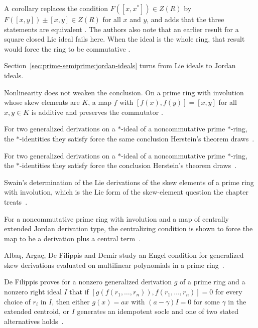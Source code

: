 A corollary replaces the condition $F([x,x^{*}])\in Z(R)$ by
$F([x,y])\pm[x,y]\in Z(R)$ for all $x$ and $y$, and adds that the three statements
are equivalent \cite[Corollary~1, p.~1950001-5]{Idrissi2019}. The authors also note
that an earlier result for a square closed Lie ideal fails here. When the ideal is
the whole ring, that result would force the ring to be commutative
\cite[p.~1950001-5]{Idrissi2019}.

Section~\ref{sec:prime-semiprime:jordan-ideals} turns from Lie ideals to Jordan
ideals.

Nonlinearity does not weaken the conclusion. On a prime ring with involution
whose skew elements are $K$, a map $f$ with $[f(x),f(y)]=[x,y]$ for all
$x,y\in K$ is additive and preserves the commutator
\cite[Abstract]{NonlinearStrongCommuting2012}.

For two generalized derivations on a $*$-ideal of a noncommutative prime $*$-ring, the $*$-identities they satisfy force the same conclusion Herstein's theorem draws~\cite{WlHersteinsTheorem2023}.

For two generalized derivations on a $*$-ideal of a noncommutative prime $*$-ring, the $*$-identities they satisfy force the conclusion Herstein's theorem draws~\cite{WlHersteinSTheoremForPairOfGener2023}.

Swain's determination of the Lie derivations of the skew elements of a prime ring with involution, which is the Lie form of the skew-element question the chapter treats~\cite{WlLieDerivationsOfTheSkewElement1996}.

For a noncommutative prime ring with involution and a map of centrally extended Jordan derivation type, the centralizing condition is shown to force the map to be a derivation plus a central term~\cite{WlCentrallyExtendedJordanDerivat2019}.

Alba\c{s}, Arga\c{c}, De Filippis and Demir study an Engel condition for generalized skew derivations evaluated on multilinear polynomials in a prime ring~\cite{WlAnEngelConditionWithGeneralize2018}.

De Filippis proves for a nonzero generalized derivation $g$ of a prime ring and a nonzero right ideal $I$ that if $[g(f(r_1,\dots,r_n)),f(r_1,\dots,r_n)]=0$ for every choice of $r_i$ in $I$, then either $g(x)=ax$ with $(a-\gamma)I=0$ for some $\gamma$ in the extended centroid, or $I$ generates an idempotent socle and one of two stated alternatives holds~\cite{WlAnEngelConditionWithGeneralize2007}.
